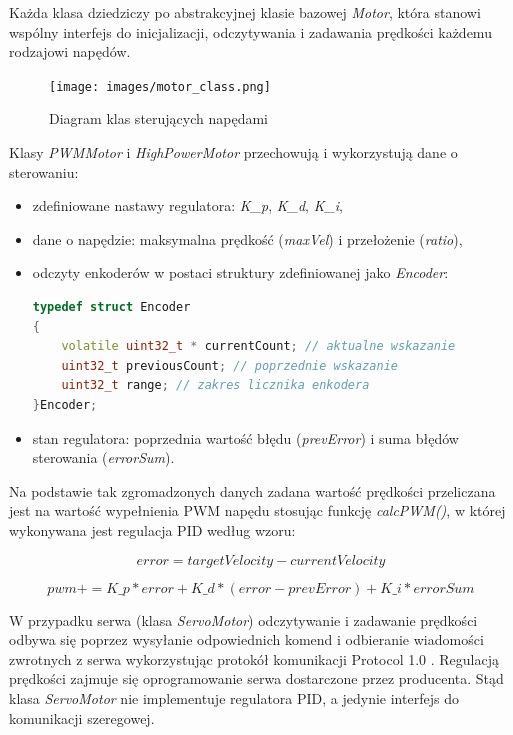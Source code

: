 \documentclass[a4paper, 12pt, twoside]{article}
\begin{document}
Każda klasa dziedziczy po abstrakcyjnej klasie bazowej \textit{Motor}, która stanowi wspólny interfejs do inicjalizacji, odczytywania i zadawania prędkości każdemu rodzajowi napędów. 

\begin{figure}[hbt!]
\centering
\texttt{[image: images/motor\_class.png]}
\caption{Diagram klas sterujących napędami}
\label{fig:motor_class}
\end{figure}

\newpage
Klasy \textit{PWMMotor} i \textit{HighPowerMotor} przechowują i wykorzystują dane o sterowaniu:

\begin{itemize}
\item zdefiniowane nastawy regulatora: \textit{K\_p}, \textit{K\_d}, \textit{K\_i},
\item dane o napędzie: maksymalna prędkość (\textit{maxVel}) i przełożenie (\textit{ratio}),
\item odczyty enkoderów w postaci struktury zdefiniowanej jako \textit{Encoder}:

\begin{lstlisting}[language=C++,
                   directivestyle={\color{black}}
                   emph={int,char,double,float,unsigned},
                   emphstyle={\color{blue}}
                  ]
typedef struct Encoder
{
	volatile uint32_t * currentCount; // aktualne wskazanie 
	uint32_t previousCount; // poprzednie wskazanie
	uint32_t range; // zakres licznika enkodera
}Encoder;
\end{lstlisting}

\item stan regulatora: poprzednia wartość błędu (\textit{prevError}) i suma błędów sterowania (\textit{errorSum}).
\end{itemize}

Na podstawie tak zgromadzonych danych zadana wartość prędkości przeliczana jest na wartość wypełnienia PWM napędu stosując funkcję \textit{calcPWM()}, w której wykonywana jest regulacja PID według wzoru:

\begin{equation} \label{eq:7}
error = targetVelocity - currentVelocity
\end{equation}


\begin{equation} \label{eq:8}
pwm += K\_p*error+K\_d*(error-prevError)
+K\_i*errorSum
\end{equation}

W przypadku serwa (klasa \textit{ServoMotor}) odczytywanie i zadawanie prędkości odbywa się poprzez wysyłanie odpowiednich komend i odbieranie wiadomości zwrotnych z serwa wykorzystując protokół komunikacji Protocol 1.0 \cite{protocol}. Regulacją prędkości zajmuje się oprogramowanie serwa dostarczone przez producenta. Stąd klasa \textit{ServoMotor} nie implementuje regulatora PID, a jedynie interfejs do komunikacji szeregowej. 
\end{document}
